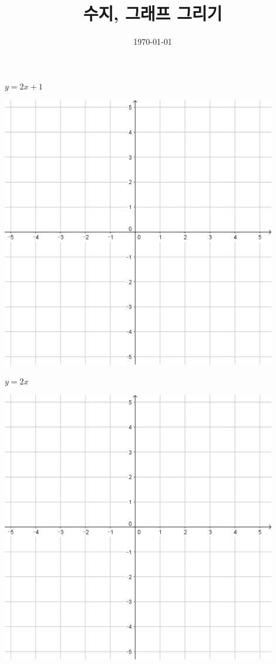 \documentclass[a4paper]{oblivoir}
\title{수지, 그래프 그리기}
\date{\today}
\author{}
\begin{document}
\maketitle
\begin{minipage}{0.45\textwidth}\centering
\(y=2x+1\)
\par\bigskip\includegraphics[width=0.9\textwidth]{55}
\end{minipage}
\begin{minipage}{0.45\textwidth}\centering
\(y=2x\)
\par\bigskip\includegraphics[width=0.9\textwidth]{55}
\end{minipage}\bigskip\bigskip\par
\end{document}
